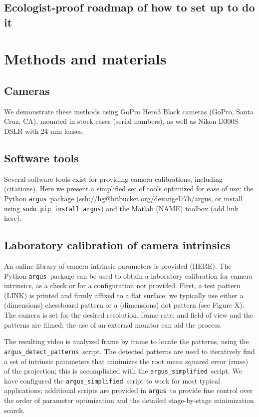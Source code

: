 \documentclass[fleqn,10pt]{wlpeerj}
\makeatletter
\newcommand{\argus}{\texttt{argus}}
\newcommand{\detectpatterns}{\texttt{argus\_detect\_patterns}}
\newcommand{\simplified}{\texttt{argus\_simplified}}
\newcommand{\pipcommand}{\texttt{sudo pip install argus}}
\newcommand{\argusrepo}{\url{ssh://hg@bitbucket.org/devangel77b/argus}}
\newcommand{\matlabtoolbox}{add link here}
\makeatother
\begin{document}
\subsection*{Ecologist-proof roadmap of how to set up to do it}

\section*{Methods and materials}
\subsection*{Cameras}
We demonstrate these methods using GoPro Hero3 Black cameras (GoPro, Santa Cruz, CA), mounted in stock cases (serial numbers), as well as Nikon D300S DSLR with 24 mm lenses. 

\subsection*{Software tools}
Several software tools exist for providing camera calibrations, including (citations).  Here we present a simplified set of tools optimized for ease of use: the Python \argus\ package (\argusrepo, or install using \pipcommand) and the Matlab (NAME) toolbox (\matlabtoolbox). 

\subsection*{Laboratory calibration of camera intrinsics}
An online library of camera intrinsic parameters is provided (HERE).  The Python \argus\ package can be used to obtain a laboratory calibration for camera intrinsics, as a check or for a configuration not provided. First, a test pattern (LINK) is printed and firmly affixed to a flat surface; we typically use either a (dimensions) chessboard pattern or a (dimensions) dot pattern (see Figure X).  The camera is set for the desired resolution, frame rate, and field of view and the patterns are filmed; the use of an external monitor can aid the process.  

The resulting video is analyzed frame by frame to locate the patterns, using the \detectpatterns\ script.  The detected patterns are used to iteratively find a set of intrinsic parameters that minimizes the root mean squared error (rmse) of the projection; this is accomplished with the \simplified\ script.  We have configured the \simplified\ script to work for most typical applications; additional scripts are provided in \argus\ to provide fine control over the order of parameter optimization and the detailed stage-by-stage minimization search.
\end{document}
